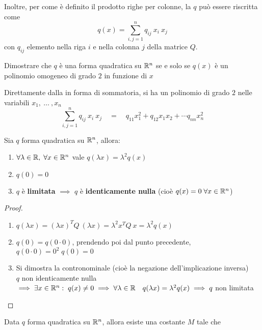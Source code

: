 \begin{appendices}
\begin{definition}
	\noindent Inoltre, per come è definito il prodotto righe per colonne, la $q$ può essere riscritta come
	\[q(x) = \sum\limits_{i, j = 1}^{n} q_{ij}\:x_i\:x_j\]
	con $q_{ij}$ elemento nella riga $i$ e nella colonna $j$ della matrice $Q$.
\end{definition}
\begin{exercise}
	Dimostrare che $q$ è una forma quadratica su $\mathbb{R}^n$ se e solo se $q(x)$ è un polinomio omogeneo di grado $2$ in funzione di $x$
	\begin{solution}
		Direttamente dalla  in forma di sommatoria, si ha un polinomio di grado $2$ nelle variabili $x_1, \:\dotsc\:, x_n$
		\[\sum\limits_{i, j = 1}^{n} q_{ij}\:x_i\:x_j \quad = \quad q_{11}x_1^2 + q_{12}x_1x_2 + \cdots q_{nn}x_n^2\]
	\end{solution}
\end{exercise}
\begin{proposition}
	\label{prop:proprieta_form_quadr}
	Sia $q$ forma quadratica su $\mathbb{R}^n$, allora:
	\begin{enumerate}
		\item \label{itm:form_quadr_lambda} $\forall \lambda \in \mathbb{R},\; \forall x \in \mathbb{R}^n$ vale $q(\lambda x) = \lambda^2 q(x)$
		\item $q(0) = 0$
		\item $q$ è \textbf{limitata} $\implies$ $q$ è \textbf{identicamente nulla} (cioè $q(x) = 0 \; \forall x \in \mathbb{R}^n$)
	\end{enumerate}
	\begin{proof}\hfill
		\begin{enumerate}
			\item $q(\lambda x) = (\lambda x)^T Q \: (\lambda x) = \lambda^2 x^T Q \: x = \lambda^2 q(x)$
			\item $q(0) = q(0 \cdot 0)$, prendendo poi dal punto precedente, $q(0 \cdot 0) = 0^2 \; q(0) = 0$
			\item Si dimostra la contronominale (cioè la negazione dell'implicazione inversa)\\
				$q$ non identicamente nulla $\implies \exists x \in \mathbb{R}^n:\; q(x) \neq 0 \implies \forall \lambda \in \mathbb{R} \quad q(\lambda x) = \lambda^2 q(x) \implies q$ non limitata
		\end{enumerate}
	\end{proof}
\end{proposition}
\begin{proposition}
	\label{prop:form_quadr_M}
	Data $q$ forma quadratica su $\mathbb{R}^n$, allora esiste una costante $M$ tale che

\end{proposition}
\end{appendices}
